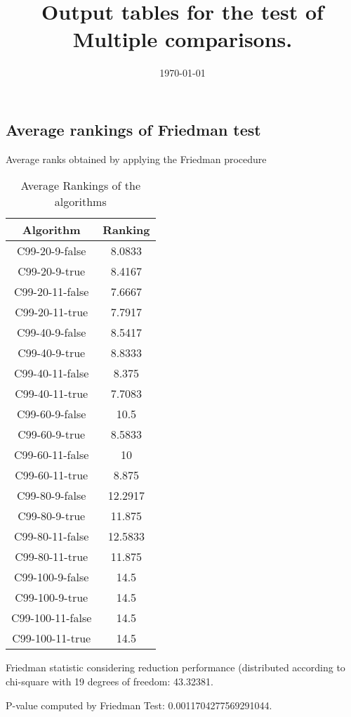 \documentclass[a4paper,10pt]{article}
\title{Output tables for the test of Multiple comparisons.}
\author{}
\date{\today}
\begin{document}
\begin{landscape}
\pagestyle{empty}
\maketitle
\thispagestyle{empty}
\section{Average rankings of Friedman test}



Average ranks obtained by applying the Friedman procedure

\begin{table}[!htp]
\centering
\begin{tabular}{|c|c|}\hline
Algorithm&Ranking\\\hline
C99-20-9-false & 8.0833\\
C99-20-9-true & 8.4167\\
C99-20-11-false & 7.6667\\
C99-20-11-true & 7.7917\\
C99-40-9-false & 8.5417\\
C99-40-9-true & 8.8333\\
C99-40-11-false & 8.375\\
C99-40-11-true & 7.7083\\
C99-60-9-false & 10.5\\
C99-60-9-true & 8.5833\\
C99-60-11-false & 10\\
C99-60-11-true & 8.875\\
C99-80-9-false & 12.2917\\
C99-80-9-true & 11.875\\
C99-80-11-false & 12.5833\\
C99-80-11-true & 11.875\\
C99-100-9-false & 14.5\\
C99-100-9-true & 14.5\\
C99-100-11-false & 14.5\\
C99-100-11-true & 14.5\\
\hline
\end{tabular}
\caption{Average Rankings of the algorithms}
\end{table}

Friedman statistic considering reduction performance (distributed according to chi-square with 19 degrees of freedom: 43.32381.

P-value computed by Friedman Test: 0.0011704277569291044.\newline




\end{landscape}
\end{document}
